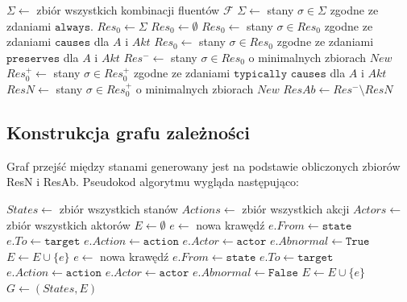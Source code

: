 \documentclass{article}
\begin{document}
\begin{algorithm}[H]
\begin{algorithmic}
\State $\Sigma \gets $ zbiór wszystkich kombinacji fluentów $\mathcal{F}$
\State $\Sigma \gets$ stany $\sigma \in \Sigma$ zgodne ze zdaniami $\texttt{always}$.
\State $Res_0 \gets \Sigma$
	\State $Res_0 \gets \emptyset$ 
\EndIf
\State $Res_0 \gets$ stany $\sigma \in Res_0$ zgodne ze zdaniami $\texttt{causes}$ dla $A$ i $Akt$
\State $Res_0 \gets$ stany $\sigma \in Res_0$ zgodne ze zdaniami $\texttt{preserves}$ dla $A$ i $Akt$
\State $Res^- \gets$ stany $\sigma \in Res_0$ o minimalnych zbiorach $New$
\State $Res^+_0 \gets$ stany $\sigma \in Res^+_0$ zgodne ze zdaniami $\texttt{typically causes}$ dla $A$ i $Akt$
\State $ResN \gets$ stany $\sigma \in Res^+_0$ o minimalnych zbiorach $New$
\State $ResAb \gets Res^- \setminus ResN$ 
\end{algorithmic}
\end{algorithm}

\newpage
\subsection{Konstrukcja grafu zależności}

Graf przejść między stanami generowany jest na podstawie obliczonych zbiorów ResN i ResAb. Pseudokod algorytmu wygląda następująco:

\begin{algorithm}[H]
\begin{algorithmic}
\State $States \gets $ zbiór wszystkich stanów
\State $Actions \gets $ zbiór wszystkich akcji
\State $Actors \gets $ zbiór wszystkich aktorów
\State $E \gets \emptyset$
				\State $e \gets$ nowa krawędź
				\State $e.From \gets \texttt{state}$
				\State $e.To \gets \texttt{target}$
				\State $e.Action \gets \texttt{action}$
				\State $e.Actor \gets \texttt{actor}$
				\State $e.Abnormal \gets \texttt{True}$
				\State $E \gets E \cup \{e\}$
			\EndFor
				\State $e \gets$ nowa krawędź
				\State $e.From \gets \texttt{state}$
				\State $e.To \gets \texttt{target}$
				\State $e.Action \gets \texttt{action}$
				\State $e.Actor \gets \texttt{actor}$
				\State $e.Abnormal \gets \texttt{False}$
				\State $E \gets E \cup \{e\}$
			\EndFor
		\EndFor
	\EndFor
\EndFor
\State $G \gets \left(States, E\right)$
\end{algorithmic}
\end{algorithm}
\end{document}
